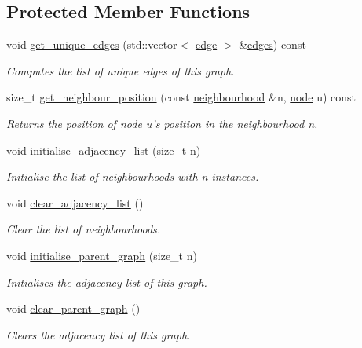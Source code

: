 \subsection*{Protected Member Functions}
\begin{DoxyCompactItemize}
\item 
void \hyperlink{classlgraph_1_1uugraph_acdfd9fd410fe5e47f5df6c0240d10e1b}{get\-\_\-unique\-\_\-edges} (std\-::vector$<$ \hyperlink{namespacelgraph_a76bd7d50719f03de7a85db259d80d572}{edge} $>$ \&\hyperlink{classlgraph_1_1uxgraph_af6a643eaca31fa945b428567ab0fa66d}{edges}) const 
\begin{DoxyCompactList}\small\item\em Computes the list of unique edges of this graph. \end{DoxyCompactList}\item 
size\-\_\-t \hyperlink{classlgraph_1_1xxgraph_a8c176b1d19cf8d0b299c419e325df21d}{get\-\_\-neighbour\-\_\-position} (const \hyperlink{namespacelgraph_a052e7766c13f3a43cec0aec8173fdede}{neighbourhood} \&n, \hyperlink{namespacelgraph_a397169dd66adf725210a30fb7251773e}{node} u) const 
\begin{DoxyCompactList}\small\item\em Returns the position of node {\itshape u's} position in the neighbourhood {\itshape n}. \end{DoxyCompactList}\item 
\hypertarget{classlgraph_1_1xxgraph_a682d586f850add8b7e637aeea81b0292}{void \hyperlink{classlgraph_1_1xxgraph_a682d586f850add8b7e637aeea81b0292}{initialise\-\_\-adjacency\-\_\-list} (size\-\_\-t n)}\label{classlgraph_1_1xxgraph_a682d586f850add8b7e637aeea81b0292}

\begin{DoxyCompactList}\small\item\em Initialise the list of neighbourhoods with {\itshape n} instances. \end{DoxyCompactList}\item 
\hypertarget{classlgraph_1_1xxgraph_a6b15c62c68919722f7eb18fe273d45fe}{void \hyperlink{classlgraph_1_1xxgraph_a6b15c62c68919722f7eb18fe273d45fe}{clear\-\_\-adjacency\-\_\-list} ()}\label{classlgraph_1_1xxgraph_a6b15c62c68919722f7eb18fe273d45fe}

\begin{DoxyCompactList}\small\item\em Clear the list of neighbourhoods. \end{DoxyCompactList}\item 
void \hyperlink{classlgraph_1_1xxgraph_a50c658dd39e6b1d38bf7e514daa2f33c}{initialise\-\_\-parent\-\_\-graph} (size\-\_\-t n)
\begin{DoxyCompactList}\small\item\em Initialises the adjacency list of this graph. \end{DoxyCompactList}\item 
void \hyperlink{classlgraph_1_1xxgraph_a4122495066e4402cbf6d2d9bb82d54cc}{clear\-\_\-parent\-\_\-graph} ()
\begin{DoxyCompactList}\small\item\em Clears the adjacency list of this graph. \end{DoxyCompactList}\end{DoxyCompactItemize}
